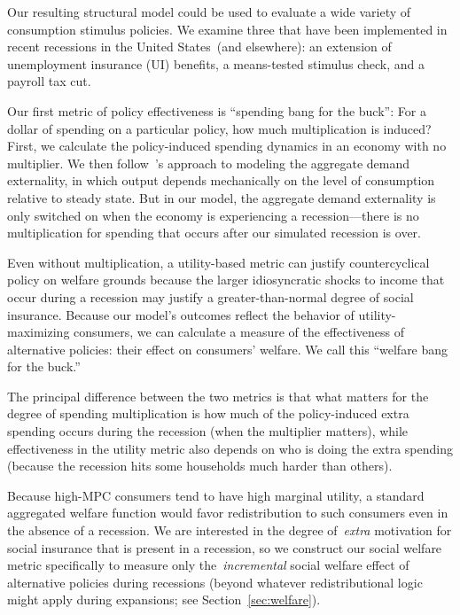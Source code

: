 \documentclass{econsocart}
\begin{document}
Our resulting structural model could be used to evaluate a wide variety of consumption stimulus policies.  We examine three that have been implemented in recent recessions in the United States\ (and elsewhere): an extension of unemployment insurance (UI) benefits, a means-tested stimulus check, and a payroll tax cut.

Our first metric of policy effectiveness is ``spending bang for the buck'': For a dollar of spending on a particular policy, how much multiplication is induced?  %
First, we calculate the policy-induced spending dynamics in an economy with no multiplier.  We then follow~\cite{kmpHandbook}'s approach to modeling the aggregate demand externality, in which output depends mechanically on the level of consumption relative to steady state. But in our model, the aggregate demand externality is only switched on when the economy is experiencing a recession---there is no multiplication for spending that occurs after our simulated recession is over.  %

Even without multiplication, a utility-based metric can justify countercyclical policy on welfare grounds because the larger idiosyncratic shocks to income that occur during a recession may justify a greater-than-normal degree of social insurance.  Because our model's outcomes reflect the behavior of utility-maximizing consumers, we can calculate a measure of the effectiveness of alternative policies:  their effect on consumers' welfare.  We call this ``welfare bang for the buck.''

The principal difference between the two metrics is that what matters for the degree of spending multiplication is how much of the policy-induced extra spending occurs during the recession (when the multiplier matters), while effectiveness in the utility metric also depends on who is doing the extra spending (because the recession hits some households much harder than others).

Because high-MPC consumers tend to have high marginal utility, a standard aggregated welfare function would favor redistribution to such consumers even in the absence of a recession. We are interested in the degree of~\textit{extra} motivation for social insurance that is present in a recession, so we construct our social welfare metric specifically to measure only the~\textit{incremental} social welfare effect of alternative policies during recessions (beyond whatever redistributional logic might apply during expansions; see Section~\ref{sec:welfare}).
\end{document}
